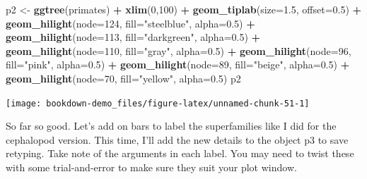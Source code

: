 \documentclass[
]{book}
\newenvironment{Shaded}{\begin{snugshade}}{\end{snugshade}}
\newcommand{\DataTypeTok}[1]{\textcolor[rgb]{0.13,0.29,0.53}{#1}}
\newcommand{\DecValTok}[1]{\textcolor[rgb]{0.00,0.00,0.81}{#1}}
\newcommand{\FloatTok}[1]{\textcolor[rgb]{0.00,0.00,0.81}{#1}}
\newcommand{\KeywordTok}[1]{\textcolor[rgb]{0.13,0.29,0.53}{\textbf{#1}}}
\newcommand{\NormalTok}[1]{#1}
\newcommand{\OperatorTok}[1]{\textcolor[rgb]{0.81,0.36,0.00}{\textbf{#1}}}
\newcommand{\StringTok}[1]{\textcolor[rgb]{0.31,0.60,0.02}{#1}}
\begin{document}
\begin{Shaded}
\begin{Highlighting}[]
\NormalTok{p2 \textless{}{-}}\StringTok{ }\KeywordTok{ggtree}\NormalTok{(primates) }\OperatorTok{+}
\StringTok{  }\KeywordTok{xlim}\NormalTok{(}\DecValTok{0}\NormalTok{,}\DecValTok{100}\NormalTok{) }\OperatorTok{+}
\StringTok{  }\KeywordTok{geom\_tiplab}\NormalTok{(}\DataTypeTok{size=}\FloatTok{1.5}\NormalTok{, }\DataTypeTok{offset=}\FloatTok{0.5}\NormalTok{) }\OperatorTok{+}
\StringTok{  }\KeywordTok{geom\_hilight}\NormalTok{(}\DataTypeTok{node=}\DecValTok{124}\NormalTok{, }\DataTypeTok{fill=}\StringTok{"steelblue"}\NormalTok{, }\DataTypeTok{alpha=}\FloatTok{0.5}\NormalTok{) }\OperatorTok{+}
\StringTok{  }\KeywordTok{geom\_hilight}\NormalTok{(}\DataTypeTok{node=}\DecValTok{113}\NormalTok{, }\DataTypeTok{fill=}\StringTok{"darkgreen"}\NormalTok{, }\DataTypeTok{alpha=}\FloatTok{0.5}\NormalTok{) }\OperatorTok{+}
\StringTok{  }\KeywordTok{geom\_hilight}\NormalTok{(}\DataTypeTok{node=}\DecValTok{110}\NormalTok{, }\DataTypeTok{fill=}\StringTok{"gray"}\NormalTok{, }\DataTypeTok{alpha=}\FloatTok{0.5}\NormalTok{) }\OperatorTok{+}
\StringTok{  }\KeywordTok{geom\_hilight}\NormalTok{(}\DataTypeTok{node=}\DecValTok{96}\NormalTok{, }\DataTypeTok{fill=}\StringTok{"pink"}\NormalTok{, }\DataTypeTok{alpha=}\FloatTok{0.5}\NormalTok{) }\OperatorTok{+}
\StringTok{  }\KeywordTok{geom\_hilight}\NormalTok{(}\DataTypeTok{node=}\DecValTok{89}\NormalTok{, }\DataTypeTok{fill=}\StringTok{"beige"}\NormalTok{, }\DataTypeTok{alpha=}\FloatTok{0.5}\NormalTok{) }\OperatorTok{+}
\StringTok{  }\KeywordTok{geom\_hilight}\NormalTok{(}\DataTypeTok{node=}\DecValTok{70}\NormalTok{, }\DataTypeTok{fill=}\StringTok{"yellow"}\NormalTok{, }\DataTypeTok{alpha=}\FloatTok{0.5}\NormalTok{) }
\NormalTok{p2}
\end{Highlighting}
\end{Shaded}

\begin{center}\texttt{[image: bookdown-demo\_files/figure-latex/unnamed-chunk-51-1]} \end{center}

So far so good. Let's add on bars to label the superfamilies like I did for the cephalopod version. This time, I'll add the new details to the object p3 to save retyping. Take note of the arguments in each label. You may need to twist these with some trial-and-error to make sure they suit your plot window.
\end{document}
